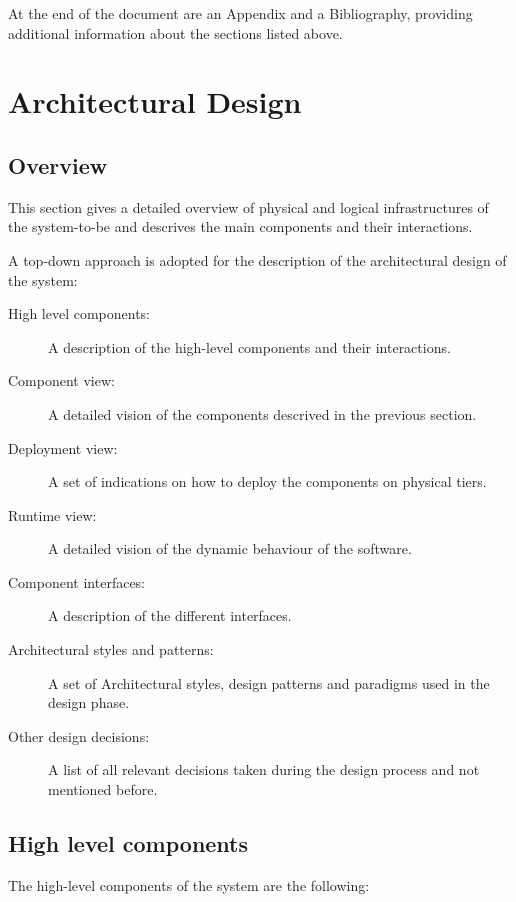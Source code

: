 \documentclass{article}
\begin{document}
	\bigskip
	At the end of the document are an Appendix and a Bibliography, providing additional information about the sections listed above.

	\section{Architectural Design}


	\subsection{Overview}

	This section gives a detailed overview of physical and logical infrastructures of the system-to-be and descrives the main components and their interactions.

	A top-down approach is adopted for the description of the architectural design of the system:

	\bigskip
	\begin{description}
	\item [High level components:] A description of the high-level components and their interactions.
	\item [Component view:] A detailed vision of the components descrived in the previous section.
	\item [Deployment view:] A set of indications on how to deploy the components on physical tiers.
	\item [Runtime view:] A detailed vision of the dynamic behaviour of the software.
	\item [Component interfaces:] A description of the different interfaces.
	\item [Architectural styles and patterns:] A set of Architectural styles, design patterns and paradigms used in the design phase.
	\item [Other design decisions:] A list of all relevant decisions taken during the design process and not mentioned before.
	\end{description}


	\subsection{High level components}

	The high-level components of the system are the following:
\end{document}
